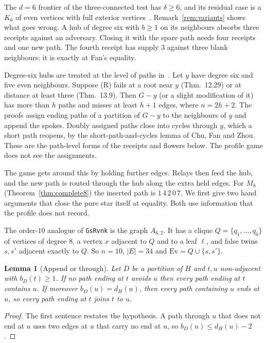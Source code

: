 \documentclass[11pt]{amsart}
\newtheorem{lemma}[theorem]{Lemma}
\theoremstyle{definition}
\newcommand{\Ev}{\mathrm{Ev}}
\begin{document}
The $d=6$ frontier of the three-connected test has $\delta\ge6$, and its residual case is a $K_6$
of even vertices with full exterior vertices~\cite[\S\S1, 3]{D6}. Remark~\ref{rem:variants} shows what
goes wrong. A hub of degree six with $b\ge1$ on its neighbours absorbs three receipts against an
adversary. Closing it with the spare path needs four receipts and one new path. The fourth receipt
has supply $3$ against three blank neighbours: it is exactly at Fan's equality.

Degree-six hubs are treated at the level of paths in~\cite[\S\S12.14, 13]{SP}. Let $y$ have degree
six and five even neighbours. Suppose (R) fails at a root near $y$ (Thm.~12.29) or at distance at
least three (Thm.~13.9). Then $G-y$ (or a slight modification of it) has more than $h$ paths and
misses at least $h+1$ edges, where $n=2h+2$. The proofs assign ending paths of a partition of
$G-y$ to the neighbours of $y$ and append the spokes. Doubly assigned paths close into cycles
through $y$, which a short path reopens, by the short-path-and-cycles lemma of Chu, Fan and Zhou.
These are the path-level forms of the receipts and flowers below. The profile game does not see
the assignments.

The game gets around this by holding further edges. Relays then feed the hub, and the new path is
routed through the hub along the extra held edges. For $M_8$ (Theorem~\ref{thm:complete8}) the
inserted path is $1\,4\,2\,0\,7$. We first give two hand arguments that close the pure star
itself at equality. Both use information that the profile does not record.

The order-$10$ analogue of \texttt{GsRvnk} is the graph $A_{6,2}$. It has a clique
$Q=\{q_1,\dots,q_6\}$ of vertices of degree $8$, a vertex $x$ adjacent to $Q$ and to a leaf
$\ell$, and false twins $s,s'$ adjacent exactly to $Q$. So $n=10$, $|E|=34$ and
$\Ev=Q\cup\{s,s'\}$.

\begin{lemma}[Append or through]\label{lem:through}
Let $D$ be a partition of $H$ and $t,u$ non-adjacent with $b_D(t)\ge1$. If no path ending at $t$
avoids $u$ then every path ending at $t$ contains $u$. If moreover $b_D(u)=d_H(u)$, then every
path containing $u$ ends at $u$, so every path ending at $t$ joins $t$ to $u$.
\end{lemma}
\begin{proof}
The first sentence restates the hypothesis. A path through $u$ that does not end at $u$ uses two
edges at $u$ that carry no end at $u$, so $b_D(u)\le d_H(u)-2$.
\end{proof}
\end{document}

